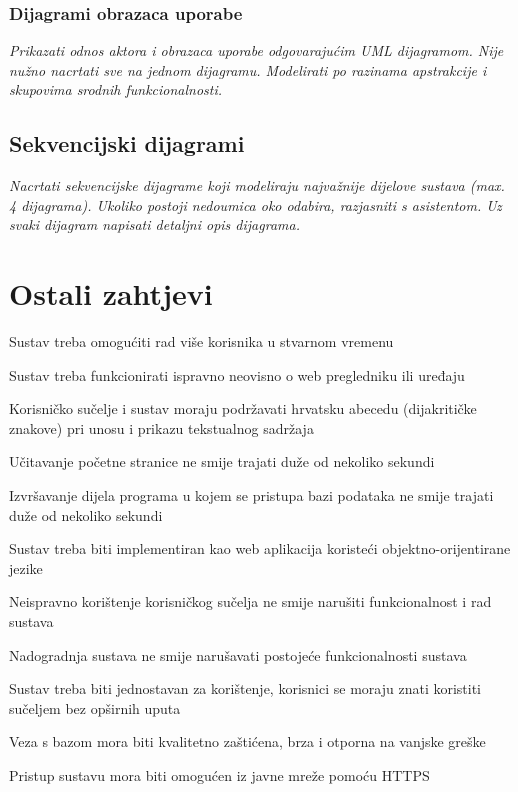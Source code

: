					
				\subsubsection{Dijagrami obrazaca uporabe}
					
					\textit{Prikazati odnos aktora i obrazaca uporabe odgovarajućim UML dijagramom. Nije nužno nacrtati sve na jednom dijagramu. Modelirati po razinama apstrakcije i skupovima srodnih funkcionalnosti.}
				\eject		
				
			\subsection{Sekvencijski dijagrami}
				
				\textit{Nacrtati sekvencijske dijagrame koji modeliraju najvažnije dijelove sustava (max. 4 dijagrama). Ukoliko postoji nedoumica oko odabira, razjasniti s asistentom. Uz svaki dijagram napisati detaljni opis dijagrama.}
				\eject
	
		\section{Ostali zahtjevi}
		 
			 \begin{packed_item}
			 
			 \item Sustav treba omogućiti rad više korisnika u stvarnom vremenu
			 \item Sustav treba funkcionirati ispravno neovisno o web pregledniku ili uređaju
			 \item Korisničko sučelje i sustav moraju podržavati hrvatsku abecedu (dijakritičke znakove) pri unosu i prikazu tekstualnog sadržaja
			 \item Učitavanje početne stranice ne smije trajati duže od nekoliko sekundi
			 \item Izvršavanje dijela programa u kojem se pristupa bazi podataka ne smije trajati duže od nekoliko sekundi
			 \item Sustav treba biti implementiran kao web aplikacija koristeći objektno-orijentirane jezike
			 \item Neispravno korištenje korisničkog sučelja ne smije narušiti funkcionalnost i rad sustava
			 \item Nadogradnja sustava ne smije narušavati postojeće funkcionalnosti sustava
			 \item Sustav treba biti jednostavan za korištenje, korisnici se moraju znati koristiti sučeljem bez opširnih uputa
			 \item Veza s bazom mora biti kvalitetno zaštićena, brza i otporna na vanjske greške
			 \item Pristup sustavu mora biti omogućen iz javne mreže pomoću HTTPS
			 
			 
			 \end{packed_item}
			 
			 
			 
	